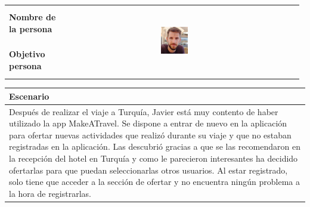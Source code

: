 \documentclass[11pt]{article}
\begin{document}
\begin{table}[H]
  \centering
  \begin{tabular}{p{0.2\linewidth}|p{0.3\linewidth}p{0.475\linewidth}}
    \toprule
    \textbf{Nombre de la persona} &  &\multirow{2}{*}{\begin{minipage}{1.\textwidth}\includegraphics[width=0.2\textwidth, height=30mm]{Javier}\end{minipage}}\\
    \textbf{Objetivo persona} &  & \\
    \bottomrule
  \end{tabular}

\begin{tabular}{p{1.028\linewidth}}
  \textbf{Escenario}\\
  \midrule
  Después de realizar el viaje a Turquía, Javier está muy contento de haber utilizado la app MakeATravel. Se dispone a entrar de nuevo en la aplicación para ofertar nuevas actividades que realizó durante su viaje y que no estaban registradas en la aplicación. Las descubrió gracias a que se las recomendaron en la recepción del hotel en Turquía y como le parecieron interesantes ha decidido ofertarlas para que puedan seleccionarlas otros usuarios. Al estar registrado, solo tiene que acceder a la sección de ofertar y no encuentra ningún problema a la hora de registrarlas.
\end{tabular}
\end{table}
\end{document}
